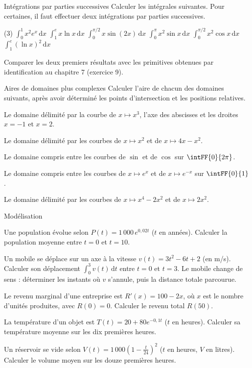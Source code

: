 \begin{exercice}[3]{Intégrations par parties successives}
Calculer les intégrales suivantes. Pour certaines, il faut effectuer deux intégrations par parties successives.
\begin{tasks}(3)
  \task $\displaystyle\int_0^1x^{2}e^{x}\,\mathrm{d}x$
  \task $\displaystyle\int_1^ex\ln x\,\mathrm{d}x$
  \task $\displaystyle\int_0^{\pi/2}x\sin(2x)\,\mathrm{d}x$
  \task $\displaystyle\int_0^{\pi}x^{2}\sin x\,\mathrm{d}x$
  \task $\displaystyle\int_0^{\pi/2}x^{2}\cos x\,\mathrm{d}x$
  \task $\displaystyle\int_1^e(\ln x)^{2}\,\mathrm{d}x$
\end{tasks}
Comparer les deux premiers résultats avec les primitives obtenues par identification au chapitre 7 (exercice 9).
\end{exercice}

\begin{exercice}[3]{Aires de domaines plus complexes}
Calculer l'aire de chacun des domaines suivants, après avoir déterminé les points d'intersection et les positions relatives.
\begin{questions}
  \item Le domaine délimité par la courbe de $x\mapsto x^{3}$, l'axe des abscisses et les droites $x=-1$ et $x=2$.
  \item Le domaine délimité par les courbes de $x\mapsto x^{2}$ et de $x\mapsto4x-x^{2}$.
  \item Le domaine compris entre les courbes de $\sin$ et de $\cos$ sur $\intFF{0}{2\pi}$.
  \item Le domaine compris entre les courbes de $x\mapsto e^{x}$ et de $x\mapsto e^{-x}$ sur $\intFF{0}{1}$.
  \item Le domaine délimité par les courbes de $x\mapsto x^{4}-2x^{2}$ et de $x\mapsto2x^{2}$.
\end{questions}
\end{exercice}

\begin{exercice}[3]{Modélisation}
\begin{questions}
  \item Une population évolue selon $P(t)=1\,000\,e^{0{,}02t}$ ($t$ en années). Calculer la population moyenne entre $t=0$ et $t=10$.
  \item Un mobile se déplace sur un axe à la vitesse $v(t)=3t^{2}-6t+2$ (en m/s). Calculer son déplacement $\int_0^3v(t)\,\mathrm{d}t$
    entre $t=0$ et $t=3$. Le mobile change de sens : déterminer les instants où $v$ s'annule, puis la distance totale parcourue.
  \item Le revenu marginal d'une entreprise est $R'(x)=100-2x$, où $x$ est le nombre d'unités produites, avec $R(0)=0$.
    Calculer le revenu total $R(50)$.
  \item La température d'un objet est $T(t)=20+80e^{-0{,}1t}$ ($t$ en heures). Calculer sa température moyenne sur les dix premières heures.
  \item Un réservoir se vide selon $V(t)=1\,000\left(1-\frac{t}{24}\right)^{2}$ ($t$ en heures, $V$ en litres). Calculer le volume moyen
    sur les douze premières heures.
\end{questions}
\end{exercice}

